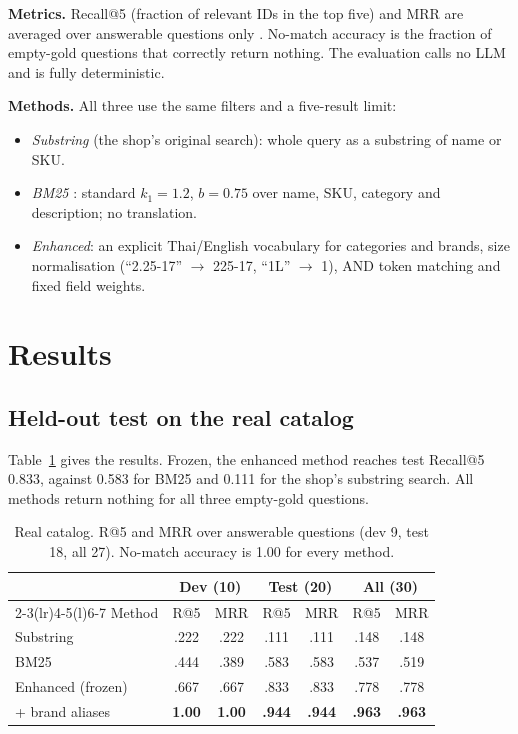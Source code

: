 \documentclass[10pt,twocolumn,a4paper]{article}
\begin{document}
\textbf{Metrics.} Recall@5 (fraction of relevant IDs in the top five) and MRR are averaged over answerable questions only \cite{iir}. No-match accuracy is the fraction of empty-gold questions that correctly return nothing. The evaluation calls no LLM and is fully deterministic.

\textbf{Methods.} All three use the same filters and a five-result limit:
\begin{itemize}
\item \emph{Substring} (the shop's original search): whole query as a substring of name or SKU.
\item \emph{BM25} \cite{bm25}: standard $k_1{=}1.2$, $b{=}0.75$ over name, SKU, category and description; no translation.
\item \emph{Enhanced}: an explicit Thai/English vocabulary for categories and brands, size normalisation (``2.25-17'' $\to$ 225-17, ``1L'' $\to$ 1), AND token matching and fixed field weights.
\end{itemize}

\section{Results}

\subsection{Held-out test on the real catalog}

Table~\ref{tab:real} gives the results. Frozen, the enhanced method reaches test Recall@5 0.833, against 0.583 for BM25 and 0.111 for the shop's substring search. All methods return nothing for all three empty-gold questions.

\begin{table}[t]
\caption{Real catalog. R@5 and MRR over answerable questions (dev 9, test 18, all 27). No-match accuracy is 1.00 for every method.}
\label{tab:real}
\centering\small\setlength{\tabcolsep}{4pt}
\begin{tabular}{@{}lcccccc@{}}
\toprule
 & \multicolumn{2}{c}{Dev (10)} & \multicolumn{2}{c}{Test (20)} & \multicolumn{2}{c}{All (30)} \\
\cmidrule(lr){2-3}\cmidrule(lr){4-5}\cmidrule(l){6-7}
Method & R@5 & MRR & R@5 & MRR & R@5 & MRR \\
\midrule
Substring & .222 & .222 & .111 & .111 & .148 & .148 \\
BM25 & .444 & .389 & .583 & .583 & .537 & .519 \\
Enhanced (frozen) & .667 & .667 & .833 & .833 & .778 & .778 \\
\quad + brand aliases & \textbf{1.00} & \textbf{1.00} & \textbf{.944} & \textbf{.944} & \textbf{.963} & \textbf{.963} \\
\bottomrule
\end{tabular}
\end{table}
\end{document}
